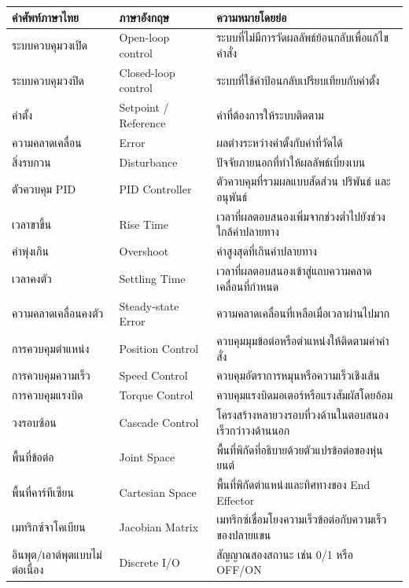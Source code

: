 \begin{table}[htbp]
    \centering
    \small
    \begin{tabularx}{\textwidth}{@{}L{0.23\textwidth} L{0.24\textwidth} X@{}}
        \hline
        \textbf{คำศัพท์ภาษาไทย} & \textbf{ภาษาอังกฤษ} & \textbf{ความหมายโดยย่อ} \\
        \hline
        ระบบควบคุมวงเปิด & Open-loop control & ระบบที่ไม่มีการวัดผลลัพธ์ย้อนกลับเพื่อแก้ไขคำสั่ง \\
        ระบบควบคุมวงปิด & Closed-loop control & ระบบที่ใช้ค่าป้อนกลับเปรียบเทียบกับค่าตั้ง \\
        ค่าตั้ง & Setpoint / Reference & ค่าที่ต้องการให้ระบบติดตาม \\
        ความคลาดเคลื่อน & Error & ผลต่างระหว่างค่าตั้งกับค่าที่วัดได้ \\
        สิ่งรบกวน & Disturbance & ปัจจัยภายนอกที่ทำให้ผลลัพธ์เบี่ยงเบน \\
        ตัวควบคุม PID & PID Controller & ตัวควบคุมที่รวมผลแบบสัดส่วน ปริพันธ์ และอนุพันธ์ \\
        เวลาขาขึ้น & Rise Time & เวลาที่ผลตอบสนองเพิ่มจากช่วงต่ำไปยังช่วงใกล้ค่าปลายทาง \\
        ค่าพุ่งเกิน & Overshoot & ค่าสูงสุดที่เกินค่าปลายทาง \\
        เวลาคงตัว & Settling Time & เวลาที่ผลตอบสนองเข้าสู่แถบความคลาดเคลื่อนที่กำหนด \\
        ความคลาดเคลื่อนคงตัว & Steady-state Error & ความคลาดเคลื่อนที่เหลือเมื่อเวลาผ่านไปมาก \\
        การควบคุมตำแหน่ง & Position Control & ควบคุมมุมข้อต่อหรือตำแหน่งให้ติดตามค่าคำสั่ง \\
        การควบคุมความเร็ว & Speed Control & ควบคุมอัตราการหมุนหรือความเร็วเชิงเส้น \\
        การควบคุมแรงบิด & Torque Control & ควบคุมแรงบิดมอเตอร์หรือแรงสัมผัสโดยอ้อม \\
        วงรอบซ้อน & Cascade Control & โครงสร้างหลายวงรอบที่วงด้านในตอบสนองเร็วกว่าวงด้านนอก \\
        พื้นที่ข้อต่อ & Joint Space & พื้นที่พิกัดที่อธิบายด้วยตัวแปรข้อต่อของหุ่นยนต์ \\
        พื้นที่คาร์ทีเซียน & Cartesian Space & พื้นที่พิกัดตำแหน่งและทิศทางของ End Effector \\
        เมทริกซ์จาโคเบียน & Jacobian Matrix & เมทริกซ์เชื่อมโยงความเร็วข้อต่อกับความเร็วของปลายแขน \\
        อินพุต/เอาต์พุตแบบไม่ต่อเนื่อง & Discrete I/O & สัญญาณสองสถานะ เช่น 0/1 หรือ OFF/ON \\

\end{tabularx}
\end{table}
